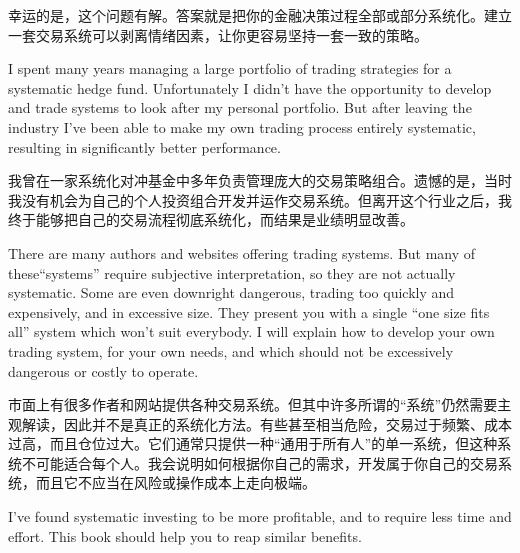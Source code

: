 \begin{chineseblock}幸运的是，这个问题有解。答案就是把你的金融决策过程全部或部分系统化。建立一套交易系统可以剥离情绪因素，让你更容易坚持一套一致的策略。\end{chineseblock}

\bipairgap

\begin{englishblock} I spent many years managing a large portfolio of trading strategies for a systematic hedge fund. Unfortunately I didn't have the opportunity to develop and trade systems to look after my personal portfolio. But after leaving the industry I've been able to make my own trading process entirely systematic, resulting in significantly better performance. \end{englishblock}

\begin{chineseblock}我曾在一家系统化对冲基金中多年负责管理庞大的交易策略组合。遗憾的是，当时我没有机会为自己的个人投资组合开发并运作交易系统。但离开这个行业之后，我终于能够把自己的交易流程彻底系统化，而结果是业绩明显改善。\end{chineseblock}

\bipairgap

\begin{englishblock} There are many authors and websites offering trading systems. But many of these``systems'' require subjective interpretation, so they are not actually systematic. Some are even downright dangerous, trading too quickly and expensively, and in excessive size. They present you with a single ``one size fits all'' system which won't suit everybody. I will explain how to develop your own trading system, for your own needs, and which should not be excessively dangerous or costly to operate. \end{englishblock}

\begin{chineseblock}市面上有很多作者和网站提供各种交易系统。但其中许多所谓的“系统”仍然需要主观解读，因此并不是真正的系统化方法。有些甚至相当危险，交易过于频繁、成本过高，而且仓位过大。它们通常只提供一种“通用于所有人”的单一系统，但这种系统不可能适合每个人。我会说明如何根据你自己的需求，开发属于你自己的交易系统，而且它不应当在风险或操作成本上走向极端。\end{chineseblock}

\bipairgap

\begin{englishblock} I've found systematic investing to be more profitable, and to require less time and effort. This book should help you to reap similar benefits. \end{englishblock}

